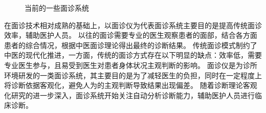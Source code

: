 \begin{figure}[h]
    \centering
    \caption{当前的一些面诊系统}
    \label{fig:med}
\end{figure}

在面诊技术相对成熟的基础上，以面诊仪为代表面诊系统主要目的是提高传统面诊效率，辅助医护人员\cite{邸丹2016手持式舌象仪的研制, 李丹溪2017舌诊仪的发展及其在舌诊客观化研究中的应用现状}。
以往的面诊需要专业的医生观察患者的面部，结合各方面患者的综合情况，根据中医面诊理论得出最终的诊断结果。
传统面诊模式制约了中医的现代化推进，一方面，传统的面诊方式存在以下明显的缺点：效率低，需要专业医生参与，且易受到医生对患者身体状况主观判断的影响。
面诊仪是为诊所环境研发的一类面诊系统，其主要目的是为了减轻医生的负担，同时在一定程度上将诊断依据客观化，避免人为的主观判断导致结果出现偏差\cite{李丹溪2017舌诊仪的发展及其在舌诊客观化研究中的应用现状}。
随着诊断理论客观化研究的进一步深入，面诊系统开始关注自动分析诊断能力，辅助医护人员进行临床诊断。

